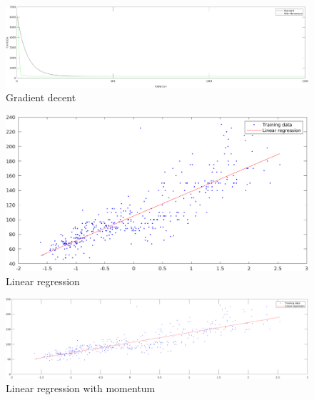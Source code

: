 \documentclass[10pt,a4paper,]{report}
\begin{document}
\begin{figure}[H]
\label{Gradient decent}
\includegraphics[width=\textwidth]{part3_momentum.png}
\caption{Gradient decent}
\end{figure}
\begin{figure}[H]
\label{Linear regression}
\includegraphics[width=\textwidth]{grad_decent_linreg.png}
\caption{Linear regression}
\end{figure}
\begin{figure}[H]
\label{Linear regression with momentum}
\includegraphics[width=\textwidth]{grad_decent_momentum_linreg.png}
\caption{Linear regression with momentum}
\end{figure}
\end{document}

